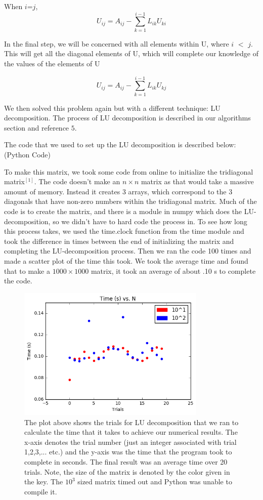 \documentclass{article}
\begin{document}
When $i$=$j$,
\begin{equation*}
U_{ij}=A_{ij} -\sum_{k=1}^{i-1} L_{ik} U_{ki}
\end{equation*}

In the final step, we will be concerned with all elements within U, where $i$ $<$ $j$. This will get all the diagonal elements of U, which will complete our knowledge of the values of the elements of U

\begin{equation*}
U_{ij} = A_{ij}- \sum_{k=1}^{i-1} L_{ik} U_{kj}
\end{equation*}

We then solved this problem again but with a different technique: LU decomposition. The process of LU decomposition is described in our algorithms section and reference ${5}$. 

The code that we used to set up the LU decomposition is described below: (Python Code)



To make this matrix, we took some code from online to initialize the tridiagonal matrix$^{[1]}$. The code doesn't make an $n\times n$ matrix as that would take a massive amount of memory. Instead it creates 3 arrays, which correspond to the 3 diagonals that have non-zero numbers within the tridiagonal matrix. Much of the code is to create the matrix, and there is a module in numpy which does the LU-decomposition, so we didn't have to hard code the process in. To see how long this process takes, we used the time.clock function from the time module and took the difference in times between the end of initializing the matrix and completing the LU-decomposition process. Then we ran the code 100 times and made a scatter plot of the time this took. We took the average time and found that to make a $1000\times1000$ matrix, it took an average of about .10 s to complete the code.

\begin{figure}[h!]
	\centering
	\includegraphics[width = 9cm]{LU_N_comparison_graph.png}
	\caption{The plot above shows the trials for LU decomposition that we ran to calculate the time that it takes to achieve our numerical results. The x-axis denotes the trial number (just an integer associated with trial 1,2,3,... etc.) and the y-axis was the time that the program took to complete in seconds. The final result was an average time over 20 trials. Note, the size of the matrix is denoted by the color given in the key. The $10^{3}$ sized matrix timed out and Python was unable to compile it.}
\end{figure}
\end{document}
